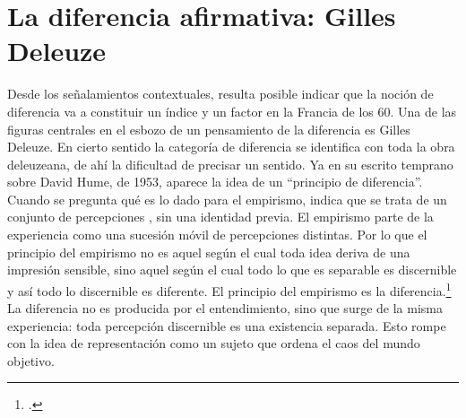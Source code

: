 \section{La diferencia afirmativa: Gilles Deleuze}

Desde los señalamientos contextuales, resulta posible indicar que la noción de diferencia va a constituir un índice y un factor en la Francia de los 60. Una de las figuras centrales en el esbozo de un pensamiento de la diferencia es Gilles Deleuze. En cierto sentido la categoría de diferencia se identifica con toda la obra deleuzeana, de ahí la dificultad de precisar un sentido. Ya en su escrito temprano sobre David Hume, de 1953, aparece la idea de un \enquote{principio de diferencia}. Cuando se pregunta qué es lo dado para el empirismo, indica que se trata de un conjunto de percepciones , sin una identidad previa. El empirismo parte de la experiencia como una sucesión móvil de percepciones distintas. Por lo que el principio del empirismo no es aquel según el cual toda idea deriva de una impresión sensible, sino aquel según el cual todo lo que es separable es discernible y así todo lo discernible es diferente. El principio del empirismo es la diferencia.\footcite[]{@6972-DELEUZE1996} La diferencia no es producida por el entendimiento, sino que surge de la misma experiencia: toda percepción discernible es una existencia separada. Esto rompe con la idea de representación como un sujeto que ordena el caos del mundo objetivo.


